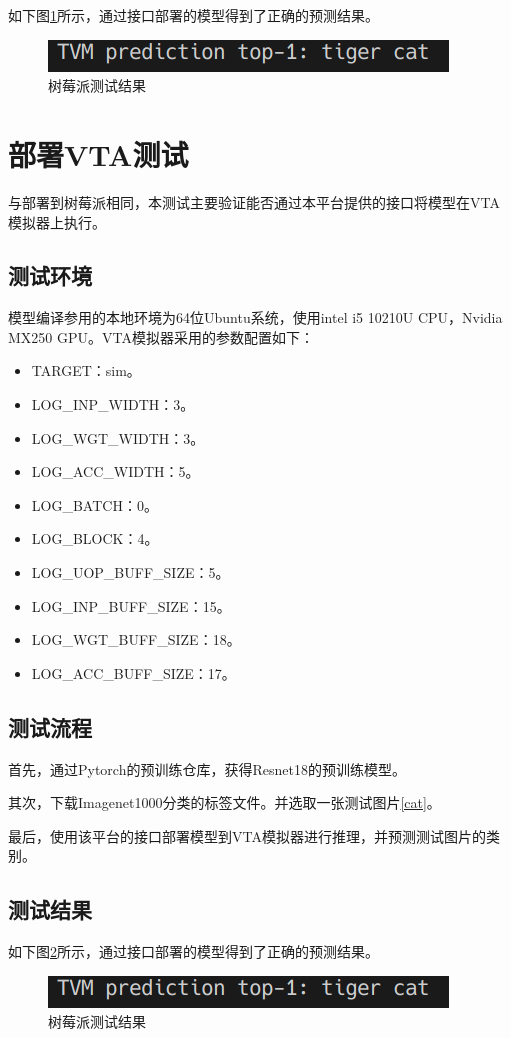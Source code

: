 如下图\ref{expr_rasp}所示，通过接口部署的模型得到了正确的预测结果。

\begin{figure}
    \centering
    \includegraphics[width=180bp]{figure/expr_rasp.png}
    \caption{树莓派测试结果}
    \label{expr_rasp}
\end{figure}


\section{部署VTA测试}

与部署到树莓派相同，本测试主要验证能否通过本平台提供的接口将模型在VTA模拟器上执行。

\subsection{测试环境}

模型编译参用的本地环境为64位Ubuntu系统，使用intel i5 10210U CPU，Nvidia MX250 GPU。VTA模拟器采用的参数配置如下：
\begin{itemize}
    \item {TARGET：sim。}
    \item {LOG\_INP\_WIDTH：3。}
    \item {LOG\_WGT\_WIDTH：3。}
    \item {LOG\_ACC\_WIDTH：5。}
    \item {LOG\_BATCH：0。}
    \item {LOG\_BLOCK：4。}
    \item {LOG\_UOP\_BUFF\_SIZE：5。}
    \item {LOG\_INP\_BUFF\_SIZE：15。}
    \item {LOG\_WGT\_BUFF\_SIZE：18。}
    \item {LOG\_ACC\_BUFF\_SIZE：17。}
\end{itemize}


\subsection{测试流程}

首先，通过Pytorch的预训练仓库，获得Resnet18的预训练模型。

其次，下载Imagenet1000分类的标签文件。并选取一张测试图片\ref{cat}。

最后，使用该平台的接口部署模型到VTA模拟器进行推理，并预测测试图片的类别。


\subsection{测试结果}


如下图\ref{expr_vta}所示，通过接口部署的模型得到了正确的预测结果。

\begin{figure}[h!]
    \centering
    \includegraphics[width=180bp]{figure/expr_rasp.png}
    \caption{树莓派测试结果}
    \label{expr_vta}
\end{figure}

